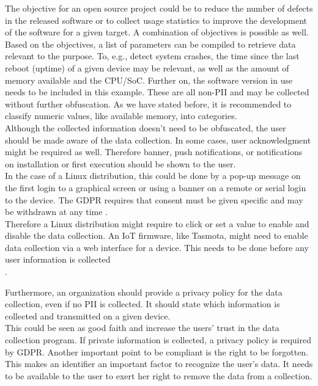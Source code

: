         The objective for an open source project could be to reduce the number of defects in the released software or to collect usage statistics to improve the development of the software for a given target. A combination of objectives is possible as well.\\
        Based on the objectives, a list of parameters can be compiled to retrieve data relevant to the purpose.
        To, e.g., detect system crashes, the time since the last reboot (uptime) of a given device may be relevant, as well as the amount of memory available and the CPU/SoC. Further on, the software version in use needs to be included in this example. These are all non-PII and may be collected without further obfuscation. As we have stated before, it is recommended to classify numeric values, like available memory, into categories.\\
        
        Although the collected information doesn't need to be obfuscated, the user should be made aware of the data collection. In some cases, user acknowledgment might be required as well. Therefore banner, push notifications, or notifications on installation or first execution should be shown to the user. \\
        In the case of a Linux distribution, this could be done by a pop-up message on the first login to a graphical screen or using a banner on a remote or serial login to the device.
        The GDPR requires that consent must be given specific and may be withdrawn at any time \cite{noauthor_gdpr_2020}.\\ 
        Therefore a Linux distribution might require to click or set a value to enable and disable the data collection. An IoT firmware, like Tasmota, might need to enable data collection via a web interface for a device. This needs to be done before any user information is collected\\. 
        
        Furthermore, an organization should provide a privacy policy for the data collection, even if no PII is collected. It should state which information is collected and transmitted on a given device.\\
        This could be seen as good faith and increase the users' trust in the data collection program. If private information is collected, a privacy policy is required by GDPR. Another important point to be compliant is the right to be forgotten. This makes an identifier an important factor to recognize the user's data. It needs to be available to the user to exert her right to remove the data from a collection.
        
